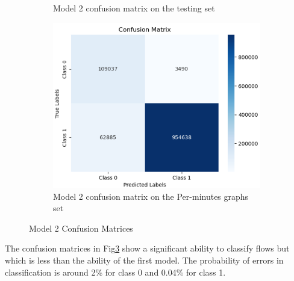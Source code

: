 \begin{figure}[H]
\begin{subfigure}{0.49\textwidth}
        \caption{Model 2 confusion matrix on the testing set}
    \label{fig:2_cm2}
    \end{subfigure}
    \begin{subfigure}{0.49\textwidth}
        \centering
        \includegraphics[width=\linewidth]{figures/ev/2_cm3.png}
        \caption{Model 2 confusion matrix on the Per-minutes graphs set}
    \label{fig:2_cm3}
    \end{subfigure}
    \captionsetup{font=large}
    \caption{Model 2 Confusion Matrices}
    \label{fig:2_cm}
\end{figure}
The confusion matrices in Fig\ref{fig:2_cm} show a significant ability to classify flows but which is less than the ability of the first model. The probability of errors in classification is around 2\%  for class 0 and 0.04\% for class 1. 
